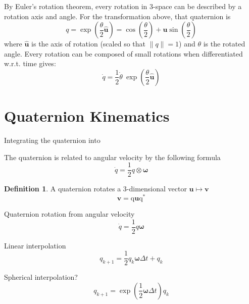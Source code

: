 \documentclass{amsart}
\theoremstyle{definition}
\newtheorem{definition}[theorem]{Definition}
\theoremstyle{remark}
\numberwithin{equation}{section}
\begin{document}
By Euler's rotation theorem, every rotation in 3-space can be described by a rotation axis and angle. For the transformation above, that quaternion is
\begin{equation}
  q = \exp\left(\frac{\theta}{2}\hat{\mathbf{u}}\right) = \cos\left(\frac{\theta}{2}\right) + \mathbf{u} \sin\left( \frac{\theta}{2}\right)
\end{equation}
where $\hat{\mathbf{u}}$ is the axis of rotation (scaled so that $\|q\|=1$) and $\theta$ is the rotated angle. Every rotation can be composed of small rotations when differentiated w.r.t. time gives:
\begin{equation}
  \dot{q} = \frac{1}{2} \dot{\theta} \ \exp\left(\frac{\theta}{2} \hat{\mathbf{u}} \right)
\end{equation}

\section*{Quaternion Kinematics}
Integrating the quaternion into

The quaternion is related to angular velocity by the following formula
\begin{equation}
  \dot{q} = \frac{1}{2} q \otimes \boldsymbol\omega
\end{equation}
%
\begin{definition}
  A quaternion rotates a 3-dimensional vector $\mathbf{u} \mapsto \mathbf{v}$
  \begin{equation}
    \mathbf{v} = \mathrm{q}\mathbf{u}\mathrm{q}^*
  \end{equation}


Quaternion rotation from angular velocity
\begin{equation}
  \dot{q} = \frac{1}{2} q\boldsymbol\omega
\end{equation}

Linear interpolation
\begin{equation}
  q_{k+1} = \frac{1}{2}q_k\boldsymbol\omega\Delta t + q_k 
\end{equation}

Spherical interpolation?
\begin{equation}
  q_{k+1} = \exp\left(\frac{1}{2} \boldsymbol\omega\Delta t\right)q_k
\end{equation}

\end{definition}
\end{document}
